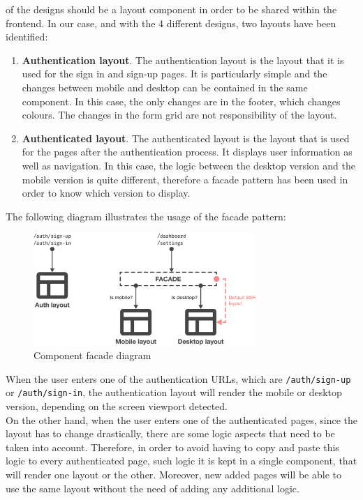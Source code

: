 \documentclass[./memory.tex]{subfiles}
\begin{document}
of the designs should be a layout component in order to be shared within the
frontend. In our case, and with the 4 different designs, two layouts have been
identified:
\begin{enumerate}[label = -]
	\item\textbf{Authentication layout}. The authentication layout is the layout
	that it is used for the sign in and sign-up pages. It is particularly
	simple and the changes between mobile and desktop can be contained in the
	same component. In this case, the only changes are in the footer, which
	changes colours. The changes in the form grid are not responsibility of the
	layout.
	\item\textbf{Authenticated layout}. The authenticated layout is the layout
	that is used for the pages after the authentication process. It displays
	user information as well as navigation. In this case, the logic between
	the desktop version and the mobile version is quite different, therefore a
	facade pattern has been used in order to know which version to display.
\end{enumerate}
The following diagram illustrates the usage of the facade pattern:
\begin{figure}[H]
	\centering
	\includegraphics[width=0.75\textwidth]{./assets/designs/layout-facade.png}
	\caption{Component facade diagram}
\end{figure}
When the user enters one of the authentication URLs, which are
\texttt{/auth/sign-up} or \texttt{/auth/sign-in}, the authentication layout will
render the mobile or desktop version, depending on the screen viewport detected.
\\
On the other hand, when the user enters one of the authenticated pages, since
the layout has to change drastically, there are some logic aspects that need to
be taken into account. Therefore, in order to avoid having to copy and paste this
logic to every authenticated page, such logic it is kept in a single component,
that will render one layout or the other. Moreover, new added pages will be able
to use the same layout without the need of adding any additional logic.
\end{document}
